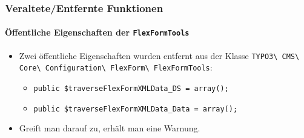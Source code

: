 \begin{frame}[fragile]
	\frametitle{Veraltete/Entfernte Funktionen}
	\framesubtitle{Öffentliche Eigenschaften der \texttt{FlexFormTools}}

	\begin{itemize}
		\item Zwei öffentliche Eigenschaften wurden entfernt aus der Klasse
			\texttt{TYPO3\textbackslash
				CMS\textbackslash
				Core\textbackslash
				Configuration\textbackslash
				FlexForm\textbackslash
				FlexFormTools}:

		\begin{itemize}
			\item \texttt{public \$traverseFlexFormXMLData\_DS = array();}
			\item \texttt{public \$traverseFlexFormXMLData\_Data = array();}
		\end{itemize}

		\item Greift man darauf zu, erhält man eine Warnung.

	\end{itemize}

\end{frame}




